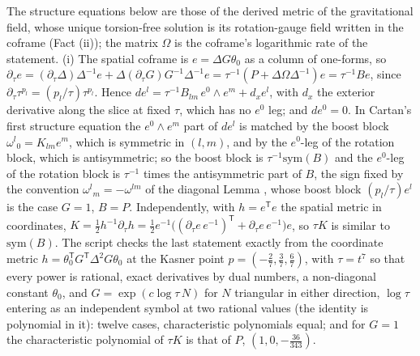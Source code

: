 The structure equations below are those of the derived metric of the gravitational field, whose unique torsion-free solution is its rotation-gauge field written in the coframe (Fact (ii)); the matrix $\Omega$ is the coframe's logarithmic rate of the statement. (i) The spatial coframe is $e = \Delta G\theta_{0}$ as a column of one-forms, so $\partial_{\tau}e = (\partial_{\tau}\Delta)\Delta^{-1}e + \Delta(\partial_{\tau}G)G^{-1}\Delta^{-1}e = \tau^{-1}(P + \Delta\Omega\Delta^{-1})e = \tau^{-1}Be$, since $\partial_{\tau}\tau^{p_{l}} = (p_{l}/\tau)\tau^{p_{l}}$. Hence $de^{l} = \tau^{-1}B_{lm}\,e^{0}\wedge e^{m} + d_{x}e^{l}$, with $d_{x}$ the exterior derivative along the slice at fixed $\tau$, which has no $e^{0}$ leg; and $de^{0} = 0$. In Cartan's first structure equation the $e^{0}\wedge e^{m}$ part of $de^{l}$ is matched by the boost block $\omega^{l}{}_{0} = K_{lm}e^{m}$, which is symmetric in $(l, m)$, and by the $e^{0}$-leg of the rotation block, which is antisymmetric; so the boost block is $\tau^{-1}\mathrm{sym}(B)$ and the $e^{0}$-leg of the rotation block is $\tau^{-1}$ times the antisymmetric part of $B$, the sign fixed by the convention $\omega^{l}{}_{m} = -\omega^{lm}$ of the diagonal Lemma , whose boost block $(p_{l}/\tau)e^{l}$ is the case $G = 1$, $B = P$. Independently, with $h = e^{\mathsf T}e$ the spatial metric in coordinates, $K = \tfrac12 h^{-1}\partial_{\tau}h = \tfrac12 e^{-1}\bigl((\partial_{\tau}e\,e^{-1})^{\mathsf T} + \partial_{\tau}e\,e^{-1}\bigr)e$, so $\tau K$ is similar to $\mathrm{sym}(B)$. The script checks the last statement exactly from the coordinate metric $h = \theta_{0}^{\mathsf T}G^{\mathsf T}\Delta^{2}G\theta_{0}$ at the Kasner point $p = (-\tfrac27, \tfrac37, \tfrac67)$, with $\tau = t^{7}$ so that every power is rational, exact derivatives by dual numbers, a non-diagonal constant $\theta_{0}$, and $G = \exp(c\log\tau\,N)$ for $N$ triangular in either direction, $\log\tau$ entering as an independent symbol at two rational values (the identity is polynomial in it): twelve cases, characteristic polynomials equal; and for $G = 1$ the characteristic polynomial of $\tau K$ is that of $P$, $(1, 0, -\tfrac{36}{343})$.

